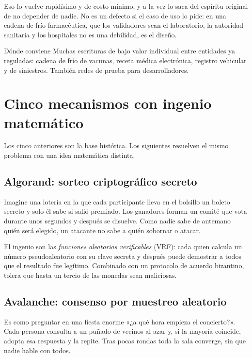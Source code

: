 \documentclass[11pt,a4paper]{article}
\theoremstyle{definition}
\theoremstyle{plain}
\theoremstyle{remark}
\begin{document}
Eso lo vuelve rapidísimo y de costo mínimo, y a la vez lo saca del espíritu
original de no depender de nadie. No es un defecto si el caso de uso lo pide: en
una cadena de frío farmacéutica, que los validadores sean el laboratorio, la
autoridad sanitaria y los hospitales no es una debilidad, es el diseño.

\begin{caso}{Dónde conviene}
Muchas escrituras de bajo valor individual entre entidades ya reguladas: cadena
de frío de vacunas, receta médica electrónica, registro vehicular y de
siniestros. También redes de prueba para desarrolladores.
\end{caso}

\section{Cinco mecanismos con ingenio matemático}\label{sec:modernos}

Los cinco anteriores son la base histórica. Los siguientes resuelven el mismo
problema con una idea matemática distinta.

\subsection{Algorand: sorteo criptográfico secreto}

Imagine una lotería en la que cada participante lleva en el bolsillo un boleto
secreto y solo él sabe si salió premiado. Los ganadores forman un comité que vota
durante unos segundos y después se disuelve. Como nadie sabe de antemano quién
será elegido, un atacante no sabe a quién sobornar o atacar.

El ingenio son las \emph{funciones aleatorias verificables} (VRF): cada quien
calcula un número pseudoaleatorio con su clave secreta y después puede demostrar
a todos que el resultado fue legítimo. Combinado con un protocolo de acuerdo
bizantino, tolera que hasta un tercio de las monedas sean maliciosas.

\subsection{Avalanche: consenso por muestreo aleatorio}

Es como preguntar en una fiesta enorme «¿a qué hora empieza el concierto?». Cada
persona consulta a un puñado de vecinos al azar y, si la mayoría coincide, adopta
esa respuesta y la repite. Tras pocas rondas toda la sala converge, sin que nadie
hable con todos.
\end{document}
